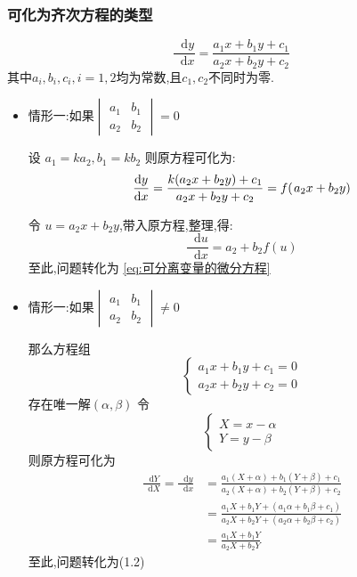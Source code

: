 \documentclass{ctexart}
\newcommand*{\dif}{\mathop{}\!\mathrm{d}}
\numberwithin{equation}{subsection}
\begin{document}
\subsubsection{可化为齐次方程的类型}
\begin{equation}
\label{eq:可化为齐次方程的类型}
\frac{{\dif y}}{{\dif x}} = \frac{{{a_1}x + {b_1}y + {c_1}}}{{{a_2}x + {b_2}y + {c_2}}}
\end{equation}
            其中${a_i},{b_i},{c_i},i = 1,2$均为常数,且${c_1},{c_2}$不同时为零.
\begin{itemize}
        \item 情形一:如果$\begin{vmatrix} {{a_1}}&{{b_1}}\\
        {{a_2}}&{{b_2}}\end{vmatrix} =0$    
                            
设 ${a_1} = k{a_2}, {b_1} = k{b_2}$
则原方程可化为:
\[\frac{{\dif y}}{{\dif x}} = \frac{{k({a_2}x + {b_2}y) + {c_1}}}{{{a_2}x + {b_2}y + {c_2}}} = f({\kern 1pt} {a_2}x + {b_2}y)\]

令 $u = {a_2}x + {b_2}y$,带入原方程,整理,得:$$\frac{{\dif u}}{{\dif x}} = {a_2} + {b_2}f(u)$$
至此,问题转化为 \eqref{eq:可分离变量的微分方程}

\item 情形一:如果$\begin{vmatrix} {{a_1}}&{{b_1}}\\
{{a_2}}&{{b_2}}\end{vmatrix} \ne 0    $

那么方程组
        $$\left\{ \begin{array}{l}
        {a_1}x + {b_1}y + {c_1} = 0\\
        {a_2}x + {b_2}y + {c_2} = 0
        \end{array} \right.$$
        存在唯一解$(\alpha ,\beta )$
        令$$\left\{ \begin{array}{l}
                X = x - \alpha \\
                Y = y - \beta 
        \end{array} \right.$$
则原方程可化为
$$\begin{aligned}
\frac{\dif Y}{\dif X}=\frac{\dif y}{\dif x} &=\frac{a_{1}(X+\alpha)+b_{1}(Y+\beta)+c_{1}}{a_{2}(X+\alpha)+b_{2}(Y+\beta)+c_{2}} \\
&=\frac{a_{1} X+b_{1} Y+\left(a_{1} \alpha+b_{1} \beta+c_{1}\right)}{a_{2} X+b_{2} Y+\left(a_{2} \alpha+b_{2} \beta+c_{2}\right)}\\
 &=\frac{a_{1} X+b_{1} Y}{a_{2} X+b_{2} Y}
\end{aligned}$$
至此,问题转化为(1.2)
\end{itemize}  
\end{document}
